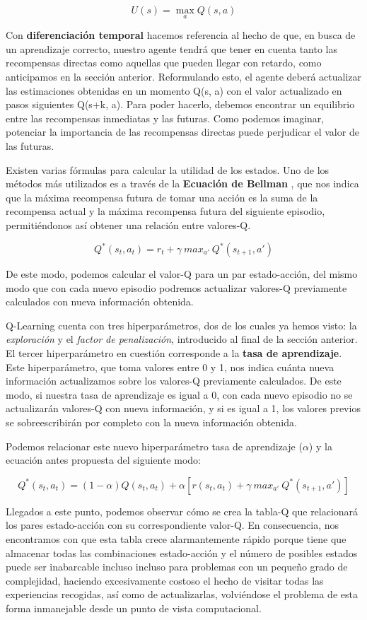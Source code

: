 $$U(s) = \max_{a}Q(s, a)$$

Con \textbf{diferenciación temporal} hacemos referencia al hecho de que, en busca de un aprendizaje correcto, nuestro agente tendrá que tener en cuenta tanto las recompensas directas como aquellas que pueden llegar con retardo, como anticipamos en la sección anterior. Reformulando esto, el agente deberá actualizar las estimaciones obtenidas en un momento Q(s, a) con el valor actualizado en pasos siguientes Q(s+k, a). Para poder hacerlo, debemos encontrar un equilibrio entre las recompensas inmediatas y las futuras. Como podemos imaginar, potenciar la importancia de las recompensas directas puede perjudicar el valor de las futuras.

Existen varias fórmulas para calcular la utilidad de los estados. Uno de los métodos más utilizados es a través de la \textbf{Ecuación de Bellman} \citet{Baird1995}, que nos indica que la máxima recompensa futura de tomar una acción es la suma de la recompensa actual y la máxima recompensa futura del siguiente episodio, permitiéndonos así obtener una relación entre valores-Q.

$$Q^*(s_{t}, a_{t}) = r_{t} + \gamma\ max_{a'}\ Q^*(s_{t+1}, a')$$

De este modo, podemos calcular el valor-Q para un par estado-acción, del mismo modo que con cada nuevo episodio podremos actualizar valores-Q previamente calculados con nueva información obtenida.

Q-Learning cuenta con tres hiperparámetros, dos de los cuales ya hemos visto: la \textit{exploración} y el \textit{factor de penalización}, introducido al final de la sección anterior. El tercer hiperparámetro en cuestión corresponde a la \textbf{tasa de aprendizaje}. Este hiperparámetro, que toma valores entre 0 y 1, nos indica cuánta nueva información actualizamos sobre los valores-Q previamente calculados. De este modo, si nuestra tasa de aprendizaje es igual a 0, con cada nuevo episodio no se actualizarán valores-Q con nueva información, y si es igual a 1, los valores previos se sobreescribirán por completo con la nueva información obtenida.

Podemos relacionar este nuevo hiperparámetro tasa de aprendizaje ($\alpha$) y la ecuación antes propuesta del siguiente modo:

$$Q^*(s_{t}, a_{t}) = (1-\alpha ) Q(s_{t}, a_{t}) + \alpha [r(s_{t}, a_{t}) + \gamma\ max_{a'}\ Q^*(s_{t+1}, a')]$$

Llegados a este punto, podemos observar cómo se crea la tabla-Q que relacionará los pares estado-acción con su correspondiente valor-Q. En consecuencia, nos encontramos con que esta tabla crece alarmantemente rápido porque tiene que almacenar todas las combinaciones estado-acción y el número de posibles estados puede ser inabarcable incluso incluso para problemas con un pequeño grado de complejidad, haciendo excesivamente costoso el hecho de visitar todas las experiencias recogidas, así como de actualizarlas, volviéndose el problema de esta forma inmanejable desde un punto de vista computacional.